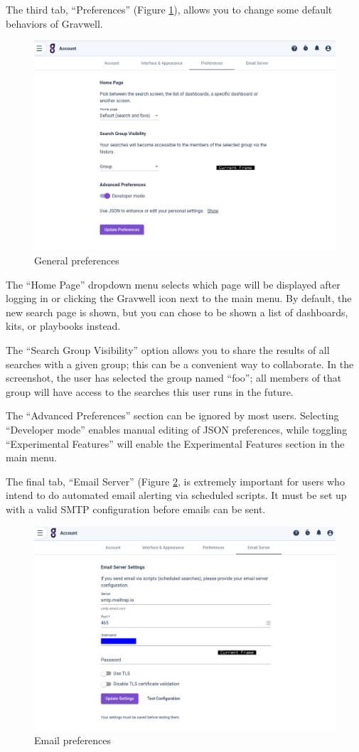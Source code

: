 The third tab, ``Preferences'' (Figure \ref{fig:general-prefs}), allows you to change some default behaviors of Gravwell.

\begin{figure}
	\includegraphics[width=0.7\linewidth]{images/general-prefs.png}
	\caption{General preferences}
	\label{fig:general-prefs}
\end{figure}


The ``Home Page'' dropdown menu selects which page will be displayed after logging in or clicking the Gravwell icon next to the main menu. By default, the new search page is shown, but you can chose to be shown a list of dashboards, kits, or playbooks instead.

The ``Search Group Visibility'' option allows you to share the results of all searches with a given group; this can be a convenient way to collaborate. In the screenshot, the user has selected the group named ``foo''; all members of that group will have access to the searches this user runs in the future.

The ``Advanced Preferences'' section can be ignored by most users. Selecting ``Developer mode'' enables manual editing of JSON preferences, while toggling ``Experimental Features'' will enable the Experimental Features section in the main menu.

The final tab, ``Email Server'' (Figure \ref{fig:email-prefs-gui}, is extremely important for users who intend to do automated email alerting via scheduled scripts. It must be set up with a valid SMTP configuration before emails can be sent.

\begin{figure}
	\includegraphics[width=0.7\linewidth]{images/email-prefs.png}
	\caption{Email preferences}
	\label{fig:email-prefs-gui}
\end{figure}

